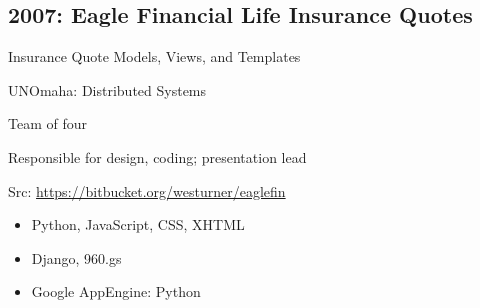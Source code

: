 \documentclass[letter,,openany,oneside]{sphinxhowto}
\begin{document}
\subsection{2007: Eagle Financial Life Insurance Quotes}
\label{resume:eagle-financial-life-insurance-quotes}
\begin{DUlineblock}{0em}
\item[] Insurance Quote Models, Views, and Templates
\item[] UNOmaha: Distributed Systems
\item[] Team of four
\item[] Responsible for design, coding; presentation lead
\item[] Src: \url{https://bitbucket.org/westurner/eaglefin}
\end{DUlineblock}
\begin{itemize}
\item {} 
Python, JavaScript, CSS, XHTML

\item {} 
Django, 960.gs

\item {} 
Google AppEngine: Python

\end{itemize}
\end{document}
